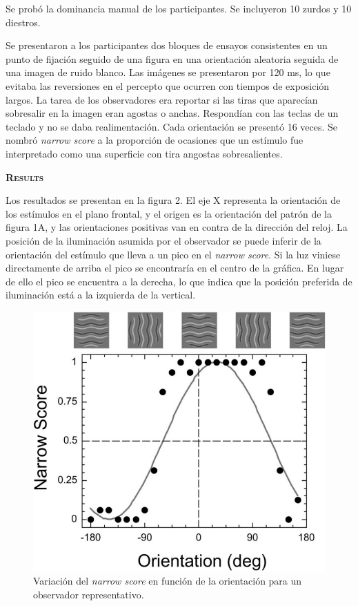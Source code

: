\documentclass[a4paper,12pt]{article}
\begin{document}
Se probó la dominancia manual de los participantes. Se incluyeron 10 zurdos y 10 diestros.

Se presentaron a los participantes dos bloques de ensayos consistentes en un punto de fijación seguido de una figura en una orientación aleatoria seguida de una imagen de ruido blanco. Las imágenes se presentaron por 120 ms, lo que evitaba las reversiones en el percepto que ocurren con tiempos de exposición largos. La tarea de los observadores era reportar si las tiras que aparecían sobresalir en la imagen eran agostas o anchas. Respondían con las teclas de un teclado y no se daba realimentación. Cada orientación se presentó 16 veces. Se nombró {\itshape narrow score} a la proporción de ocasiones que un estímulo fue interpretado como una superficie con tira angostas sobresalientes.

{\scshape\bfseries Results}

Los resultados se presentan en la figura 2. El eje X representa la orientación de los estímulos en el plano frontal, y el origen es la orientación del patrón de la figura 1A, y las orientaciones positivas van en contra de la dirección del reloj. La posición de la iluminación asumida por el observador se puede inferir de la orientación del estímulo que lleva a un pico en el {\itshape narrow score}. Si la luz viniese directamente de arriba el pico se encontraría en el centro de la gráfica. En lugar de ello el pico se encuentra a la derecha, lo que indica que la posición preferida de iluminación está a la izquierda de la vertical.

\begin{figure}[ht]
	\begin{center}
		\includegraphics[scale=0.4]{Mamassian2001(2).png}
		\caption{Variación del {\itshape narrow score} en función de la orientación para un observador representativo.}
	\end{center}
\end{figure}
\end{document}
